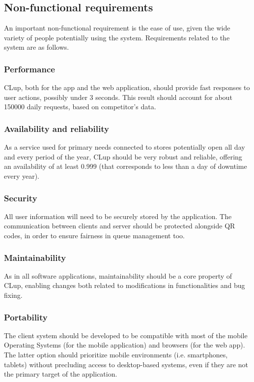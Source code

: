 
\subsection{Non-functional requirements}
An important non-functional requirement is the ease of use, given the wide variety of people potentially using the system. Requirements related to the system are as follows.

\subsubsection{Performance}
CLup, both for the app and the web application, should provide fast responses to user actions, possibly under 3 seconds\textsuperscript{\cite{speed}}. This result should account for about 150000 daily requests, based on competitor's data\textsuperscript{\cite{ufirst}}.

\subsubsection{Availability and reliability}
As a service used for primary needs connected to stores potentially open all day and every period of the year, CLup should be very robust and reliable, offering an availability of at least 0.999 (that corresponds to less than a day of downtime every year).

\subsubsection{Security}
All user information will need to be securely stored by the application. The communication between clients and server should be protected alongside QR codes, in order to ensure fairness in queue management too.

\subsubsection{Maintainability}
As in all software applications, maintainability should be a core property of CLup, enabling changes both related to modifications in functionalities and bug fixing.

\subsubsection{Portability}
The client system should be developed to be compatible with most of the mobile Operating Systems (for the mobile application) and browsers (for the web app). The latter option should prioritize mobile environments (i.e. smartphones, tablets) without precluding access to desktop-based systems, even if they are not the primary target of the application.